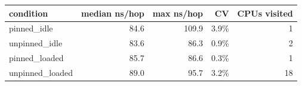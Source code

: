 \begin{tabular}{lrrrr}
\toprule
condition & median ns/hop & max ns/hop & CV & CPUs visited \\
\midrule
pinned\_idle & 84.6 & 109.9 & 3.9\% & 1 \\
unpinned\_idle & 83.6 & 86.3 & 0.9\% & 2 \\
pinned\_loaded & 85.7 & 86.6 & 0.3\% & 1 \\
unpinned\_loaded & 89.0 & 95.7 & 3.2\% & 18 \\
\bottomrule
\end{tabular}
